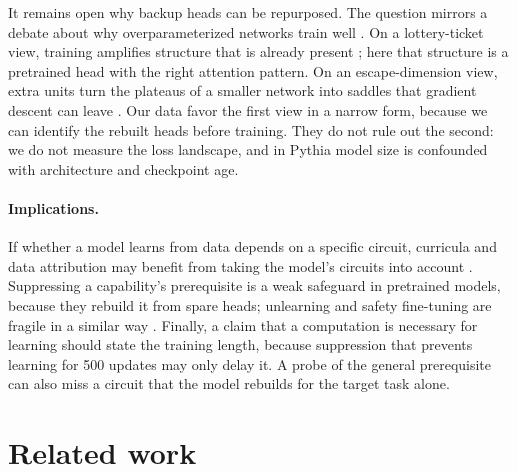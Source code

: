 It remains open why backup heads can be repurposed. The question mirrors a debate
about why overparameterized networks train well \citep{martinelli2026escape}. On a
lottery-ticket view, training amplifies structure that is already present
\citep{frankle2019lottery}; here that structure is a pretrained head with the right
attention pattern. On an escape-dimension view, extra units turn the plateaus of a smaller network into saddles that gradient descent can leave \citep{fukumizu2000local,simsek2021geometry}.
Our data favor the first view in a narrow form, because we can identify the rebuilt
heads before training. They do not rule out the second: we do not measure the loss
landscape, and in Pythia model size is confounded with architecture and checkpoint
age.

\paragraph{Implications.}
If whether a model learns from data depends on a specific circuit, curricula and
data attribution may benefit from taking the model's circuits into account
\citep{chen2023skillit,lee2026influence,chen2026mda}. Suppressing a capability's
prerequisite is a weak safeguard in pretrained models, because they rebuild it from
spare heads; unlearning and safety fine-tuning are fragile in a similar way
\citep{qi2024finetuning,lee2024mechanistic,che2025tampering,tamirisa2025tamper}.
Finally, a claim that a computation is necessary for learning should state the
training length, because suppression that prevents learning for 500 updates may only
delay it. A probe of the general prerequisite can also miss a circuit that the model
rebuilds for the target task alone.

\section{Related work}
\label{sec:related}

